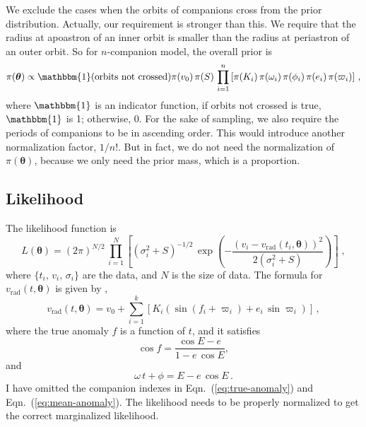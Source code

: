 \documentclass[letterpaper, preprint]{aastex}
\newcommand{\bth} {\boldsymbol \theta}
\begin{document}
We exclude the cases when the orbits of companions cross from the prior distribution. Actually, our requirement is stronger than this. We require that the radius at apoastron of an inner orbit is smaller than the radius at periastron of an outer orbit. So for $n$-companion model, the overall prior is
\begin{equation}
\pi(\bth) \propto \mathbbm{1}(\mbox{orbits not crossed}) \pi(v_0)\,\pi(S)\,\prod_{i=1}^n\left[ \pi(K_i)\,\pi(\omega_i)\,\pi(\phi_i)\,\pi(e_i)\,\pi(\varpi_i)  \right] \, ,
\end{equation}
where $\mathbbm{1}$ is an indicator function, if orbits not crossed is true, $\mathbbm{1}$ is 1; otherwise, 0.  For the sake of sampling, we also require the periods of companions to be in ascending order. This would introduce another normalization factor, $1/n!$. But in fact, we do not need the normalization of $\pi(\bth)$, because we only need the prior mass, which is a proportion.

\subsection{Likelihood}
The likelihood function is
\begin{equation}
L(\bth)=
(2\pi)^{N/2} \, \prod_{i=1}^N \left[ (\sigma_i^2+S)^{-1/2}\, \exp{\left( - \frac{(v_i-v_{\mbox{rad}}(t_i,\bth))^2}{2(\sigma_i^2+S)}\right)} \right] \; ,
\end{equation}
where $\{t_i,\,v_i,\,\sigma_i\}$ are the data, and $N$ is the size of data. The formula for $v_{\mbox{rad}}(t,\bth)$ is given by \citep{ohta05a},
\begin{equation}
v_{\mbox{rad}}(t,\bth) = v_0 + \sum_{i=1}^k\left[K_i\left(\sin{(f_i+\varpi_i)}+e_i\,\sin{\varpi_i}\right)\right]\, ,
\end{equation}
where the true anomaly $f$ is a function of $t$, and it satisfies
\begin{equation}
\cos{f} = \frac{ \cos{E} - e}{1 - e\,\cos{E}},
\label{eq:true-anomaly}
\end{equation}
and
\begin{equation}
\omega\,t + \phi = E - e\,\cos{E}\, .
\label{eq:mean-anomaly}
\end{equation}
I have omitted the companion indexes in Eqn.~(\ref{eq:true-anomaly}) and Eqn.~(\ref{eq:mean-anomaly}). The likelihood needs to be properly normalized to get the correct marginalized likelihood.
\end{document}
